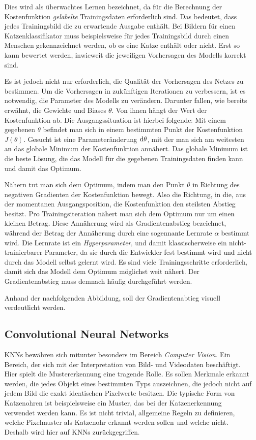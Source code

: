 Dies wird als überwachtes Lernen bezeichnet, da für die Berechnung der Kostenfunktion \emph{gelabelte} Trainingsdaten erforderlich sind. Das bedeutet, dass jedes Trainingsbild die zu erwartende Ausgabe enthält. Bei Bildern für einen Katzenklassifikator muss beispielsweise für jedes Trainingsbild durch einen Menschen gekennzeichnet werden, ob es eine Katze enthält oder nicht. Erst so kann bewertet werden, inwieweit die jeweiligen Vorhersagen des Modells korrekt sind.

Es ist jedoch nicht nur erforderlich, die Qualität der Vorhersagen des Netzes zu bestimmen. Um die Vorhersagen in zukünftigen Iterationen zu verbessern, ist es notwendig, die Parameter des Modells zu verändern. Darunter fallen, wie bereits erwähnt, die Gewichte und Biases $\theta$. Von ihnen hängt der Wert der Kostenfunktion ab. Die Ausgangssituation ist hierbei folgende: Mit einem gegebenen $\theta$ befindet man sich in einem bestimmten Punkt der Kostenfunktion $J(\theta)$. Gesucht ist eine Parameteränderung $\mathop{}\!\mathrm{d}\theta$, mit der man sich am weitesten an das globale Minimum der Kostenfunktion annähert. Das globale Minimum ist die beste Lösung, die das Modell für die gegebenen Trainingsdaten finden kann und damit das Optimum.

Nähern tut man sich dem Optimum, indem man den Punkt $\theta$ in Richtung des negativen Gradienten der Kostenfunktion bewegt. Also die Richtung, in die, aus der momentanen Ausgangsposition, die Kostenfunktion den steilsten Abstieg besitzt. Pro Trainingsiteration nähert man sich dem Optimum nur um einen kleinen Betrag. Diese Annäherung wird als Gradientenabstieg bezeichnet, während der Betrag der Annäherung durch eine sogennante Lernrate $\alpha$ bestimmt wird. Die Lernrate ist ein \emph{Hyperparameter}, und damit klassischerweise ein nicht-trainierbarer Parameter, da sie durch die Entwickler fest bestimmt wird und nicht durch das Modell selbst gelernt wird. Es sind viele Trainingsschritte erforderlich, damit sich das Modell dem Optimum möglichst weit nähert. Der Gradientenabstieg muss demnach häufig durchgeführt werden.

Anhand der nachfolgenden Abbildung, soll der Gradientenabtieg visuell verdeutlicht werden.
\subsection{Convolutional Neural Networks}
\acp{KNN} bewähren sich mitunter besonders im Bereich \emph{Computer Vision}. Ein Bereich, der sich mit der Interpretation von Bild- und Videodaten beschäftigt. Hier spielt die Mustererkennung eine tragende Rolle. Es sollen Merkmale erkannt werden, die jedes Objekt eines bestimmten Typs auszeichnen, die jedoch nicht auf jedem Bild die exakt identischen Pixelwerte besitzen. Die typische Form von Katzenohren ist beispielsweise ein Muster, das bei der Katzenerkennung verwendet werden kann. Es ist nicht trivial, allgemeine Regeln zu definieren, welche Pixelmuster als Katzenohr erkannt werden sollen und welche nicht. Deshalb wird hier auf \acp{KNN} zurückgegriffen.

